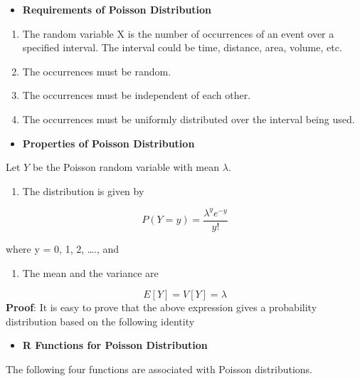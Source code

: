 \documentclass[
]{book}
\providecommand{\tightlist}{%
  \setlength{\itemsep}{0pt}\setlength{\parskip}{0pt}}
\begin{document}
\begin{itemize}
\tightlist
\item
  \textbf{Requirements of Poisson Distribution}
\end{itemize}

\begin{enumerate}
\def\labelenumi{\arabic{enumi}.}
\tightlist
\item
  The random variable X is the number of occurrences of an event over a specified interval. The interval could be time, distance, area, volume, etc.
\item
  The occurrences must be random.
\item
  The occurrences must be independent of each other.
\item
  The occurrences must be uniformly distributed over the interval being used.
\end{enumerate}

\begin{itemize}
\tightlist
\item
  \textbf{Properties of Poisson Distribution}
\end{itemize}

Let \(Y\) be the Poisson random variable with mean \(\lambda\).

\begin{enumerate}
\def\labelenumi{\arabic{enumi}.}
\tightlist
\item
  The distribution is given by
\end{enumerate}

\[
 P(Y=y) = \frac{\lambda^y e^{-y}}{y!}
 \]

where y = 0, 1, 2, \ldots., and

\begin{enumerate}
\def\labelenumi{\arabic{enumi}.}
\setcounter{enumi}{1}
\tightlist
\item
  The mean and the variance are
\end{enumerate}

\[ E[Y] = V[Y] = \lambda \]
\textbf{Proof}: It is easy to prove that the above expression gives a probability distribution based on the following identity

\begin{itemize}
\tightlist
\item
  \textbf{R Functions for Poisson Distribution}
\end{itemize}

The following four functions are associated with Poisson distributions.
\end{document}
